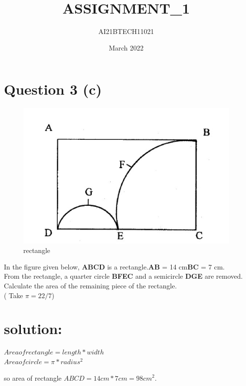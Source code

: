 \documentclass{article}
\title{ASSIGNMENT_1}
\author{AI21BTECH11021}
\date{March 2022}
\begin{document}
\maketitle

\section*{Question 3 (c)}
\begin{figure}[h!]
    \centering
    \includegraphics[scale = 0.5]{Figure_1.jpg}
    \caption{rectangle}
    \label{fig:my_label}
\end{figure}

In the figure given below, \textbf{ABCD} is a rectangle.\textbf{AB} = 14 cm\textbf{BC} = 7 cm.\\
From the rectangle, a quarter circle \textbf{BFEC} and a semicircle \textbf{DGE} are removed.\\
Calculate the area of the remaining piece of the rectangle.\\
( Take $ \pi = 22/7 $)\\

\section*{solution:}
\begin{center}
    $Area of rectangle = length*width$\\
    
    $Area of circle =\pi*radius^2 $\\
\end{center}
 \begin{center}
     so area of rectangle $ABCD = 14cm*7cm = 98cm^2$.\\
 \end{center}
\end{document}
